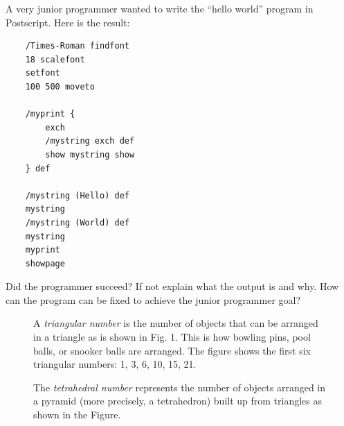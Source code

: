 \documentclass [11pt, a4wide, twoside]{article}
\begin{document}
\newpage

\noindent
%

A very junior programmer wanted to write the ``hello world'' program in Postscript. Here is the result: 

\begin{small}
\begin{verbatim}
    /Times-Roman findfont
    18 scalefont
    setfont
    100 500 moveto

    /myprint {
        exch
        /mystring exch def
        show mystring show
    } def

    /mystring (Hello) def
    mystring
    /mystring (World) def
    mystring
    myprint
    showpage
\end{verbatim}
\end{small}

\begin{myenumerate}
\item Did the programmer succeed? If not explain what the output is and why. How can the program can be fixed to achieve the junior programmer goal?
\end{myenumerate}




\newpage

\noindent
%

\begin{figure}[htb]
\begin{minipage}{.65\textwidth}
A \emph{triangular number} is the number of objects that can be arranged in a triangle as is shown in Fig. 1. This is how bowling pins, pool balls, or snooker balls are arranged. The figure shows the first six triangular numbers: 1, 3, 6, 10, 15, 21.

The \emph{tetrahedral number} represents the number of objects arranged in a pyramid (more precisely, a tetrahedron) built up from triangles as shown in the Figure.
\end{minipage}
\begin{minipage}[c]{.35\textwidth}
\end{minipage}
\end{figure}
\end{document}
